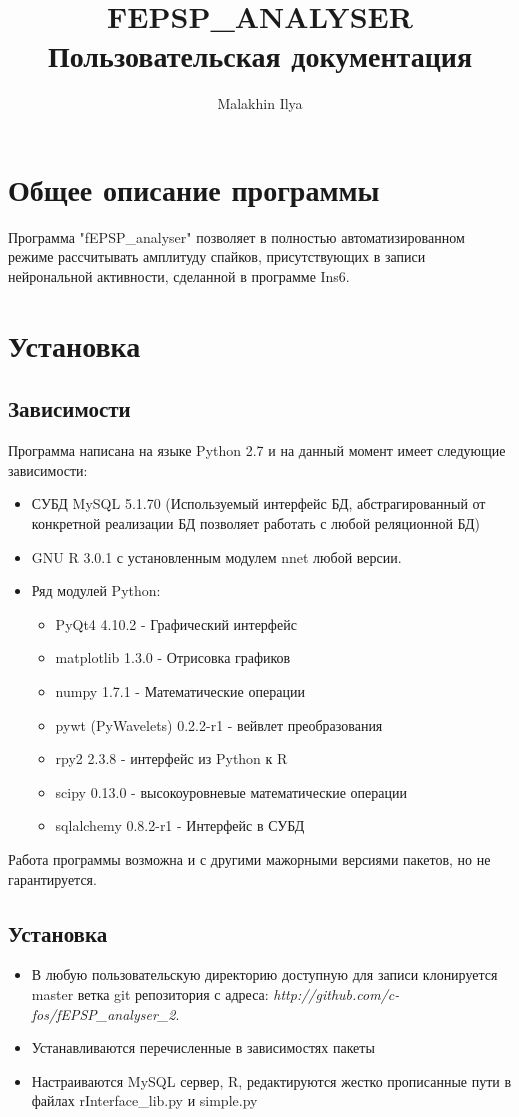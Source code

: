 \documentclass[12pt,a4paper]{report}
\author{Malakhin Ilya}
\title{\huge{FEPSP\_ANALYSER}\\ \large{Пользовательская документация}}
\begin{document}
\maketitle
\chapter{Общее описание программы}
Программа "fEPSP\_analyser" позволяет в полностью автоматизированном режиме рассчитывать амплитуду спайков, присутствующих в записи нейрональной активности, сделанной в программе Ins6.
\chapter{Установка}
\section{Зависимости}
Программа написана на языке Python 2.7 и на данный момент имеет следующие зависимости:
\begin{itemize}
\item СУБД MySQL 5.1.70 (Используемый интерфейс БД, абстрагированный от конкретной реализации БД позволяет работать с любой реляционной БД)
\item GNU R 3.0.1 с установленным модулем nnet любой версии.
\item Ряд модулей Python:
\begin{itemize}
\item PyQt4 4.10.2 - Графический интерфейс
\item matplotlib 1.3.0 - Отрисовка графиков
\item numpy 1.7.1 - Математические операции
\item pywt (PyWavelets) 0.2.2-r1 - вейвлет преобразования  
\item rpy2 2.3.8 - интерфейс из Python к R
\item scipy 0.13.0 - высокоуровневые математические операции
\item sqlalchemy 0.8.2-r1 - Интерфейс в СУБД
\end{itemize}
\end{itemize}
Работа программы возможна и с другими мажорными версиями пакетов, но не гарантируется.
\section{Установка}
\begin{itemize}
\item В любую пользовательскую директорию доступную для записи клонируется master ветка git репозитория с адреса: \textit{http://github.com/c-fos/fEPSP\_analyser\_2}.
\item Устанавливаются перечисленные в зависимостях пакеты
\item Настраиваются MySQL сервер, R, редактируются жестко прописанные пути в файлах rInterface\_lib.py и simple.py
\end{itemize}
\end{document}
